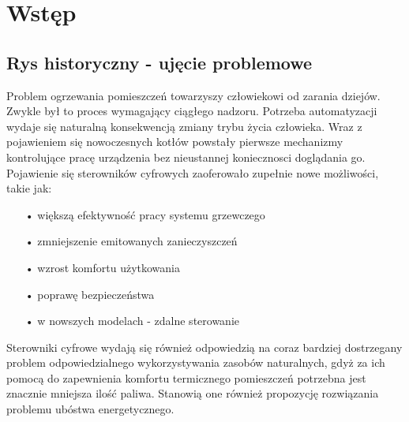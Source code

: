 \documentclass[12pt]{report}
\begin{document}
 \begin{titlepage}
 \vspace{0.1\textheight}
 \bigskip
 \vspace{0.3\textheight}
 \par

 \vspace{0.1\textheight}
 \end{titlepage}


 \tableofcontents


 \chapter{Wstęp}
 \section{Rys historyczny - ujęcie problemowe}
 Problem ogrzewania pomieszczeń towarzyszy człowiekowi od zarania dziejów. Zwykle był to proces wymagający ciągłego nadzoru. Potrzeba automatyzacji wydaje się naturalną konsekwencją zmiany trybu życia człowieka. Wraz z pojawieniem się nowoczesnych kotłów powstały pierwsze mechanizmy kontrolujące pracę urządzenia bez nieustannej koniecznosci doglądania go.
 Pojawienie się sterowników cyfrowych zaoferowało zupełnie nowe możliwości, takie jak:
  \begin{enumerate}
 \item[•] większą efektywność pracy systemu grzewczego
 \item[•] zmniejszenie emitowanych zanieczyszczeń
 \item[•] wzrost komfortu użytkowania
 \item[•] poprawę bezpieczeństwa
 \item[•] w nowszych modelach - zdalne sterowanie
  \end{enumerate}
 Sterowniki cyfrowe wydają się również odpowiedzią na coraz bardziej dostrzegany problem odpowiedzialnego wykorzystywania zasobów naturalnych, gdyż za ich pomocą do zapewnienia komfortu termicznego pomieszczeń potrzebna jest znacznie mniejsza ilość paliwa. Stanowią one również propozycję rozwiązania problemu ubóstwa energetycznego.
\end{document}
